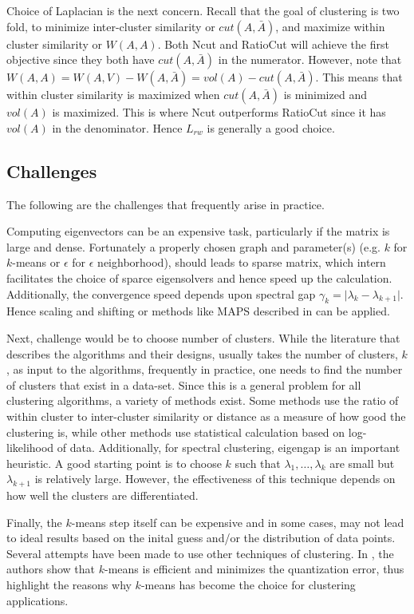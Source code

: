 \documentclass[10pt,a4paper, nocenter]{report}
\newcommand{\abs}[1]{\lvert {#1} \rvert}
\begin{document}
    Choice of Laplacian is the next concern. Recall that the goal of clustering is two fold, to minimize inter-cluster similarity or $cut(A,\bar{A})$, and maximize within cluster similarity or $W(A,A)$. Both Ncut and RatioCut will achieve the first objective since they both have $cut(A,\bar{A})$ in the numerator. However, note that $W(A,A) = W(A,V) - W(A,\bar{A}) = vol(A) - cut(A,\bar{A})$. This means that within cluster similarity is maximized when $cut(A,\bar{A})$ is minimized and $vol(A)$ is maximized. This is where Ncut outperforms RatioCut since it has $vol(A)$ in the denominator. Hence $L_{rw}$ is generally a good choice.

    \subsection{Challenges}

    The following are the challenges that frequently arise in practice. 

    Computing eigenvectors can be an expensive task, particularly if the matrix is large and dense. Fortunately a properly chosen graph and parameter(s) (e.g. $k$ for $k$-means or $\epsilon$ for $\epsilon$ neighborhood), should leads to sparse matrix, which intern facilitates the choice of sparce eigensolvers and hence speed up the calculation. Additionally, the convergence speed depends upon spectral gap $\gamma_k = \abs{\lambda_k - \lambda_{k+1}}$. Hence scaling and shifting or methods like MAPS described in \cite{Lu2015AcceleratedAF} can be applied. 

    Next, challenge would be to choose number of clusters. While the literature that describes the algorithms and their designs, usually takes the number of clusters, $k$, as input to the algorithms, frequently in practice, one needs to find the number of clusters that exist in a data-set. Since this is a general problem for all clustering algorithms, a variety of methods exist. Some methods use the ratio of within cluster to inter-cluster similarity or distance as a measure of how good the clustering is, while other methods use statistical calculation based on log-likelihood of data. Additionally, for spectral clustering, eigengap is an important heuristic. A good starting point is to choose $k$ such that $\lambda_1,\dots,\lambda_k$ are small but $\lambda_{k+1}$ is relatively large. However, the effectiveness of this technique depends on how well the clusters are differentiated.

    Finally, the $k$-means step itself can be expensive and in some cases, may not lead to ideal results based on the inital guess and/or the distribution of data points. Several attempts have been made to use other techniques of clustering. In \cite{Bottou95convergenceproperties}, the authors show that $k$-means is efficient and minimizes the quantization error, thus highlight the reasons why $k$-means has become the choice for clustering applications. 
    
\end{document}
